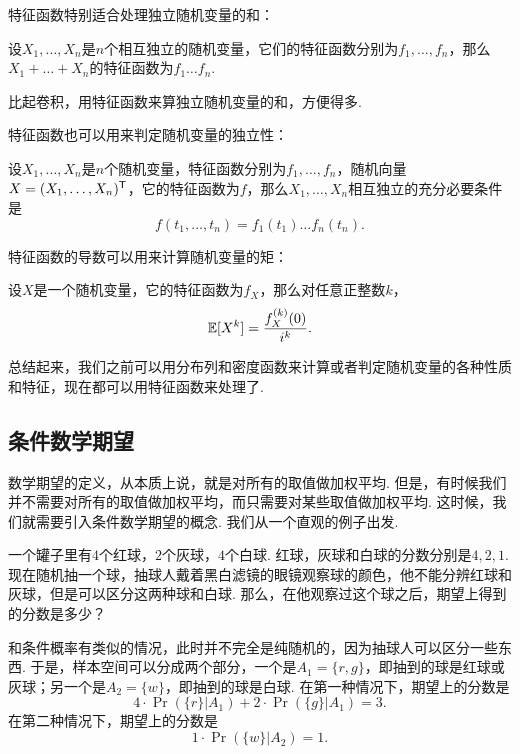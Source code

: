 特征函数特别适合处理独立随机变量的和：

\begin{theorem}\label{theorem:characteristic-function-sum}
设$X_1,\dots,X_n$是$n$个相互独立的随机变量，它们的特征函数分别为$f_1,\dots,f_n$，那么$X_1+\dots+X_n$的特征函数为$f_1\dots f_n$.
\end{theorem}

比起卷积，用特征函数来算独立随机变量的和，方便得多. 

特征函数也可以用来判定随机变量的独立性：

\begin{theorem}\label{theorem:characteristic-function-independence}
设$X_1,\dots,X_n$是$n$个随机变量，特征函数分别为$f_1,\dots,f_n$，随机向量$X=(X_1,\dots,X_n)^{\mathsf{T}}$，它的特征函数为$f$，那么$X_1,\dots,X_n$相互独立的充分必要条件是
\[f(t_1,\dots,t_n)=f_1(t_1)\dots f_n(t_n).\]
\end{theorem}

特征函数的导数可以用来计算随机变量的矩：

\begin{theorem}\label{theorem:characteristic-function-moment}
设$X$是一个随机变量，它的特征函数为$f_X$，那么对任意正整数$k$，
\[\mathbb{E}[X^k]=\frac{f_X^{(k)}(0)}{i^k}.\]
\end{theorem}

总结起来，我们之前可以用分布列和密度函数来计算或者判定随机变量的各种性质和特征，现在都可以用特征函数来处理了. 

\subsection{条件数学期望}\label{subsec:conditional-expectation}

数学期望的定义，从本质上说，就是对所有的取值做加权平均. 但是，有时候我们并不需要对所有的取值做加权平均，而只需要对某些取值做加权平均. 这时候，我们就需要引入条件数学期望的概念. 我们从一个直观的例子出发. 

\begin{example}
一个罐子里有$4$个红球，$2$个灰球，$4$个白球. 红球，灰球和白球的分数分别是$4,2,1$. 现在随机抽一个球，抽球人戴着黑白滤镜的眼镜观察球的颜色，他不能分辨红球和灰球，但是可以区分这两种球和白球. 那么，在他观察过这个球之后，期望上得到的分数是多少？

和条件概率有类似的情况，此时并不完全是纯随机的，因为抽球人可以区分一些东西. 于是，样本空间可以分成两个部分，一个是$A_1=\{r,g\}$，即抽到的球是红球或灰球；另一个是$A_2=\{w\}$，即抽到的球是白球. 在第一种情况下，期望上的分数是
\[4\cdot\Pr(\{r\}|A_1)+2\cdot\Pr(\{g\}|A_1)=3.\]
在第二种情况下，期望上的分数是
\[1\cdot\Pr(\{w\}|A_2)=1.\]
\end{example}

